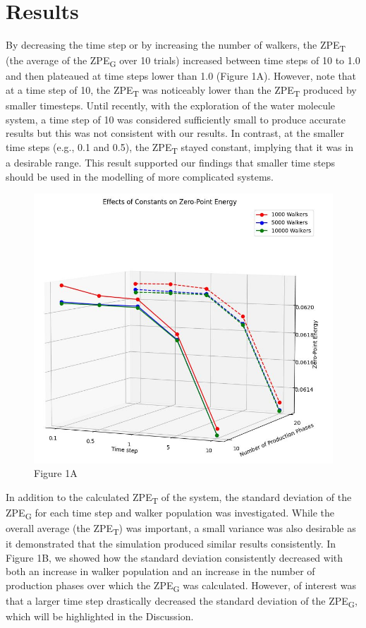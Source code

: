 \documentclass[journal=jacsat,manuscript=article]{achemso}
\begin{document}
\section{Results}

By decreasing the time step or by increasing the number of walkers, the ZPE\textsubscript{T} (the average of the ZPE\textsubscript{G} over 10 trials) increased between time steps of 10 to 1.0 and then plateaued at time steps lower than 1.0 (Figure 1A). However, note that at a time step of 10, the ZPE\textsubscript{T} was noticeably lower than the ZPE\textsubscript{T} produced by smaller timesteps. Until recently, with the exploration of the water molecule system, a time step of 10 was considered sufficiently small to produce accurate results but this was not consistent with our results. In contrast, at the smaller time steps (e.g., 0.1 and 0.5), the ZPE\textsubscript{T} stayed constant, implying that it was in a desirable range. This result supported our findings that smaller time steps should be used in the modelling of more complicated systems. 

\begin{figure}
  \includegraphics[width=\linewidth]{fig_1A.jpg}
  \caption{Figure 1A}
  \label{fig:2A}
\end{figure}

In addition to the calculated ZPE\textsubscript{T} of the system, the standard deviation of the ZPE\textsubscript{G} for each time step and walker population was investigated. While the overall average (the ZPE\textsubscript{T}) was important, a small variance was also desirable as it demonstrated that the simulation produced similar results consistently. In Figure 1B, we showed how the standard deviation consistently decreased with both an increase in walker population and an increase in the number of production phases over which the ZPE\textsubscript{G} was calculated. However, of interest was that a larger time step drastically decreased the standard deviation of the ZPE\textsubscript{G}, which will be highlighted in the Discussion. 
\end{document}
